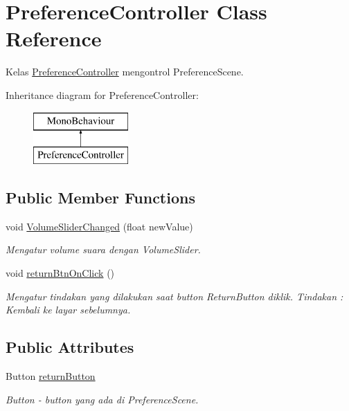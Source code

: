 \hypertarget{class_preference_controller}{}\section{Preference\+Controller Class Reference}
\label{class_preference_controller}


Kelas \hyperlink{class_preference_controller}{Preference\+Controller} mengontrol Preference\+Scene.  


Inheritance diagram for Preference\+Controller\+:\begin{figure}[H]
\begin{center}
\leavevmode
\includegraphics[height=2.000000cm]{class_preference_controller}
\end{center}
\end{figure}
\subsection*{Public Member Functions}
\begin{DoxyCompactItemize}
\item 
void \hyperlink{class_preference_controller_ac1f51dd39b0846f7259bcf2e028cd486}{Volume\+Slider\+Changed} (float new\+Value)
\begin{DoxyCompactList}\small\item\em Mengatur volume suara dengan Volume\+Slider. \end{DoxyCompactList}\item 
void \hyperlink{class_preference_controller_a27079e068e495b9815668db8ceaff04b}{return\+Btn\+On\+Click} ()
\begin{DoxyCompactList}\small\item\em Mengatur tindakan yang dilakukan saat button Return\+Button diklik. Tindakan \+: Kembali ke layar sebelumnya. \end{DoxyCompactList}\end{DoxyCompactItemize}
\subsection*{Public Attributes}
\begin{DoxyCompactItemize}
\item 
Button \hyperlink{class_preference_controller_a1eae6170b41b81919c9ecf14c0ecb86c}{return\+Button}
\begin{DoxyCompactList}\small\item\em Button -\/ button yang ada di Preference\+Scene. \end{DoxyCompactList}\end{DoxyCompactItemize}


